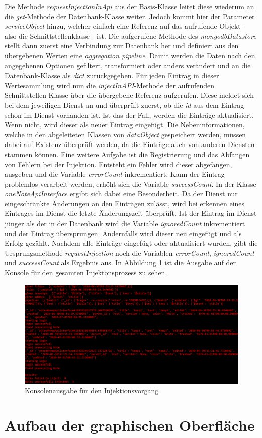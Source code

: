 Die Methode \textit{requestInjectionInApi} aus der Basis-Klasse leitet diese wiederum an die \textit{get}-Methode der Datenbank-Klasse weiter. Jedoch kommt hier der Parameter \textit{serviceObject} hinzu, welcher einfach eine Referenz auf das aufrufende Objekt - also die Schnittstellenklasse - ist. Die aufgerufene Methode des \textit{mongodbDatastore} stellt dann zuerst eine Verbindung zur Datenbank her und definiert aus den übergebenen Werten eine \textit{aggregation pipeline}. Damit werden die Daten nach den angegebenen Optionen gefiltert, transformiert oder anders verändert und an die Datenbank-Klasse als \textit{dict} zurückgegeben. Für jeden Eintrag in dieser Wertesammlung wird nun die \textit{injectInAPI}-Methode der aufrufenden Schnittstellen-Klasse über die übergebene Referenz aufgerufen. Diese meldet sich bei dem jeweiligen Dienst an und überprüft zuerst, ob die \textit{id} aus dem Eintrag schon im Dienst vorhanden ist. Ist das der Fall, werden die Einträge aktualisiert. Wenn nicht, wird dieser als neuer Eintrag eingefügt. Die Nebeninformationen, welche in den abgeleiteten Klassen von \textit{dataObject} gespeichert werden, müssen dabei auf Existenz überprüft werden, da die Einträge auch von anderen Diensten stammen können. Eine weitere Aufgabe ist die Registrierung und das Abfangen von Fehlern bei der Injektion. Entsteht ein Fehler wird dieser abgefangen, ausgeben und die Variable \textit{errorCount} inkrementiert. Kann der Eintrag problemlos verarbeit werden, erhöht sich die Variable \textit{successCount}. In der Klasse \textit{oneNoteApiInterface} ergibt sich dabei eine Besonderheit. Da der Dienst nur eingeschränkte Änderungen an den Einträgen zulässt, wird bei erkennen eines Eintrages im Dienst die letzte Änderungszeit überprüft. Ist der Eintrag im Dienst jünger als der in der Datenbank wird die Variable \textit{ignoredCount} inkrementiert und der Eintrag übersprungen. Andernfalls wird dieser neu eingefügt und als Erfolg gezählt. Nachdem alle Einträge eingefügt oder aktualisiert wurden, gibt die Ursprungsmethode \textit{requestInjection} noch die Variablen \textit{errorCount}, \textit{ignoredCount} und \textit{successCount} als Ergebnis aus. In Abbildung \ref{fig:bspInj} ist die Ausgabe auf der Konsole für den gesamten Injektonsprozess zu sehen. 

\begin{figure}[H]
	\centering
	\includegraphics[width=1\textwidth]{Bilder/umsetzung/BeispielInject.png}
	\caption{Konsolenausgabe für den Injektionsvorgang}
	\label{fig:bspInj}
\end{figure}

\section{Aufbau der graphischen Oberfläche}